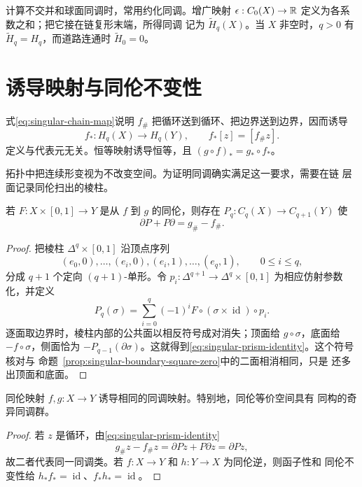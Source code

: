 计算不交并和球面同调时，常用约化同调。增广映射
$\epsilon:C_0(X)\to\mathbb{R}$ 定义为各系数之和；把它接在链复形末端，所得同调
记为 $\widetilde H_q(X)$。当 $X$ 非空时，$q>0$ 有
$\widetilde H_q=H_q$，而道路连通时 $\widetilde H_0=0$。

\section{诱导映射与同伦不变性}

式\eqref{eq:singular-chain-map}说明 $f_\#$ 把循环送到循环、把边界送到边界，因而诱导
\[
 f_*:H_q(X)\to H_q(Y),\qquad f_*[z]=[f_\#z].
\]
定义与代表元无关。恒等映射诱导恒等，且
$(g\circ f)_*=g_*\circ f_*$。

拓扑中把连续形变视为不改变空间。为证明同调确实满足这一要求，需要在链
层面记录同伦扫出的棱柱。

\begin{lemma}[棱柱算子]\label{lem:prism-operator}
若 $F:X\times[0,1]\to Y$ 是从 $f$ 到 $g$ 的同伦，则存在
$P_q:C_q(X)\to C_{q+1}(Y)$ 使
\begin{equation}\label{eq:singular-prism-identity}
 \partial P+P\partial=g_\#-f_\#.
\end{equation}
\end{lemma}
\begin{proof}
把棱柱 $\Delta^q\times[0,1]$ 沿顶点序列
\[
 (e_0,0),\ldots,(e_i,0),(e_i,1),\ldots,(e_q,1),
 \qquad 0\le i\le q,
\]
分成 $q+1$ 个定向 $(q+1)$-单形。令 $p_i:\Delta^{q+1}\to
\Delta^q\times[0,1]$ 为相应仿射参数化，并定义
\[
 P_q(\sigma)=\sum_{i=0}^q(-1)^iF\circ(\sigma\times\operatorname{id})
 \circ p_i.
\]
逐面取边界时，棱柱内部的公共面以相反符号成对消失；顶面给
$g\circ\sigma$，底面给 $-f\circ\sigma$，侧面恰为
$-P_{q-1}(\partial\sigma)$。这就得到\eqref{eq:singular-prism-identity}。这个符号核对与
命题~\ref{prop:singular-boundary-square-zero}中的二面相消相同，只是
还多出顶面和底面。
\end{proof}

\begin{theorem}[同伦不变性]\label{thm:homotopy-invariance-singular}
同伦映射 $f,g:X\to Y$ 诱导相同的同调映射。特别地，同伦等价空间具有
同构的奇异同调群。
\end{theorem}
\begin{proof}
若 $z$ 是循环，由\eqref{eq:singular-prism-identity}
\[
 g_\#z-f_\#z=\partial Pz+P\partial z=\partial Pz,
\]
故二者代表同一同调类。若 $f:X\to Y$ 和 $h:Y\to X$ 为同伦逆，则函子性和
同伦不变性给 $h_*f_*=\operatorname{id}$、$f_*h_*=\operatorname{id}$。
\end{proof}

